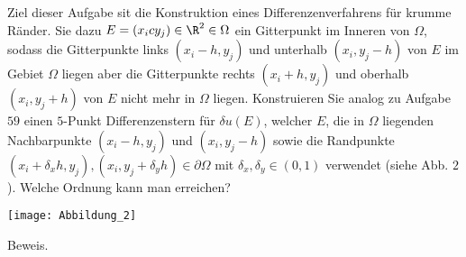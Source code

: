 \begin{exercise}
  Ziel dieser Aufgabe sit die Konstruktion eines Differenzenverfahrens für krumme
  Ränder. Sie dazu $E =(x_ic y_j) \in \R^2 \in \Omega$ ein Gitterpunkt im Inneren
  von $\Omega$, sodass die Gitterpunkte links $(x_i -h, y_j)$ und unterhalb
  $(x_i,y_j -h)$ von $E$ im Gebiet $\Omega$ liegen aber die Gitterpunkte rechts
  $(x_i + h, y_j)$ und oberhalb $(x_i, y_j + h)$ von $E$ nicht mehr in $\Omega$ liegen.
  Konstruieren Sie analog zu Aufgabe $59$ einen $5$-Punkt Differenzenstern für
  $\delta u(E)$, welcher $E$, die in $\Omega$ liegenden Nachbarpunkte $(x_i -h, y_j)$
  und $(x_i, y_j -h)$ sowie die Randpunkte
  $(x_i + \delta_x h , y_j), (x_i, y_j + \delta_y h) \in \partial \Omega$ mit
  $\delta_x, \delta_y \in (0,1)$ verwendet (siehe Abb. $2$). Welche Ordnung kann man
  erreichen?

  \texttt{[image: Abbildung\_2]}
\end{exercise}

\begin{solution}
  Beweis.
\end{solution}
